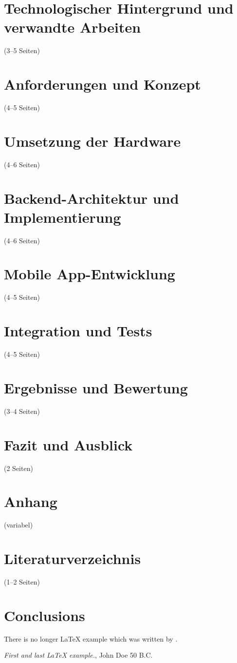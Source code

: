 \documentclass[a4paper, 12pt]{article} %
\begin{document}
\section{Technologischer Hintergrund und verwandte Arbeiten}(3–5 Seiten)
\section{Anforderungen und Konzept}(4–5 Seiten)
\section{Umsetzung der Hardware}(4–6 Seiten)
\section{Backend-Architektur und Implementierung}(4–6 Seiten)
\section{Mobile App-Entwicklung}(4–5 Seiten)
\section{Integration und Tests}(4–5 Seiten)
\section{Ergebnisse und Bewertung}(3–4 Seiten)
\section{Fazit und Ausblick}(2 Seiten)
\section{Anhang}(variabel)
\section{Literaturverzeichnis}(1–2 Seiten)

\section{Conclusions}\label{conclusions}
There is no longer \LaTeX{} example which was written by \cite{doe}.

\begin{thebibliography}{9}
 \emph{First and last \LaTeX{} example.},
John Doe 50 B.C. 
\end{thebibliography}
\end{document}
